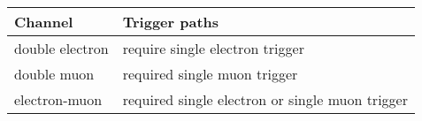 \begin{table}[]
    \begin{tabular}{@{}ll@{}}
    \toprule
    Channel  & Trigger paths                           \\ \midrule
    double electron & require single electron trigger             \\
    double muon & required single muon trigger \\             
    electron-muon & required single electron or single muon trigger                      \\ \bottomrule
    \end{tabular}
\end{table}